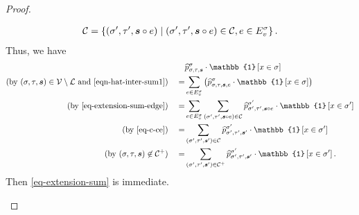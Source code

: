 \documentclass[11pt]{article}
\renewcommand{\mid}{\;\middle\vert\;} \newcommand{\cmid}{\,:\,}
\newcommand{\id}[1]{\mathbb{1}\left[#1\right]}
\newcommand{\seqS}{\boldsymbol{s}}
\begin{document}
\begin{proof}
\begin{itemize}
    \begin{align}\label{eq-c-ce}
    \+C = \left\{(\sigma',\tau', \seqS\circ e)\mid (\sigma',\tau', \seqS\circ e)\in \+C,e\in E_v^{\sigma}\right\}.
    \end{align}
    Thus, we have 
    \begin{align*}
       &\widehat{p}^{\sigma}_{\sigma, \tau, \seqS} \cdot \id{x \in \sigma} \\
       (\text{by $(\sigma,\tau,\seqS)\in \+V\setminus \+L$ and \eqref{eqn-hat-inter-sum1}})\quad = &\sum_{e \in  E_v^{\sigma}} \left(\widehat{p}^{\sigma}_{\sigma, \tau, \seqS, e}\cdot \id{x \in \sigma}\right)\\ 
       (\text{by \eqref{eq-extension-sum-edge}})\quad = &\sum_{e \in  E_v^{\sigma}}\sum_{(\sigma',\tau', \seqS\circ e)\in \+C} \widehat{p}^{\sigma'}_{\sigma',\tau',\seqS\circ e}\cdot\id{ x\in \sigma'}\\
       (\text{by \eqref{eq-c-ce}})\quad  =&\sum_{(\sigma',\tau', \seqS')\in \+C} \widehat{p}^{\sigma'}_{\sigma',\tau',\seqS'}\cdot\id{ x\in \sigma'}\\
(\text{by $(\sigma,\tau,\seqS) \not\in \+C^{+}$})\quad =&\sum_{(\sigma',\tau', \seqS')\in \+C^{+}} \widehat{p}^{\sigma'}_{\sigma',\tau',\seqS'}\cdot\id{ x\in \sigma'}.
    \end{align*}
    Then \eqref{eq-extension-sum} is immediate.
    

\end{itemize}
\end{proof}
\end{document}
